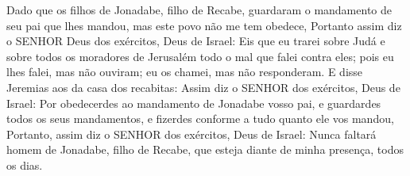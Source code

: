 {Dado que os filhos de Jonadabe, filho de Recabe, guardaram o mandamento de seu pai que lhes mandou, mas este povo não me tem obedece,
Portanto assim diz o SENHOR Deus dos exércitos, Deus de Israel: Eis que eu trarei sobre Judá e sobre todos os moradores de Jerusalém todo o mal que falei contra eles; pois eu lhes falei, mas não ouviram; eu os chamei, mas não responderam.
E disse Jeremias aos da casa dos recabitas: Assim diz o SENHOR dos exércitos, Deus de Israel: Por obedecerdes ao mandamento de Jonadabe vosso pai, e guardardes todos os seus mandamentos, e fizerdes conforme a tudo quanto ele vos mandou,
Portanto, assim diz o SENHOR dos exércitos, Deus de Israel: Nunca faltará homem
{} de Jonadabe, filho de Recabe, que esteja diante de minha presença, todos os dias.

\par }


